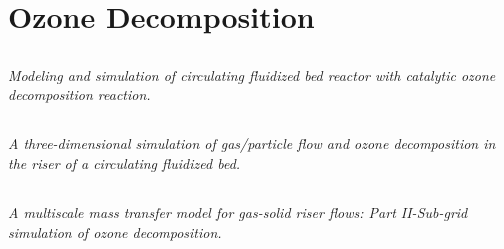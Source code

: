 \section{Ozone Decomposition}
%
%
\subsection[2003]{\cite{Therdthianwong2003}}
\textit{Modeling and simulation of circulating fluidized bed reactor with catalytic ozone decomposition reaction.}

%
%
\subsection[2004]{\cite{Hansen2004}}
\textit{A three-dimensional simulation of gas/particle flow and ozone decomposition in the riser of a circulating fluidized bed.}

%
%
\subsection[2008]{\cite{Dong2008}}
\textit{A multiscale mass transfer model for gas-solid riser flows: Part II-Sub-grid simulation of ozone decomposition.} 



